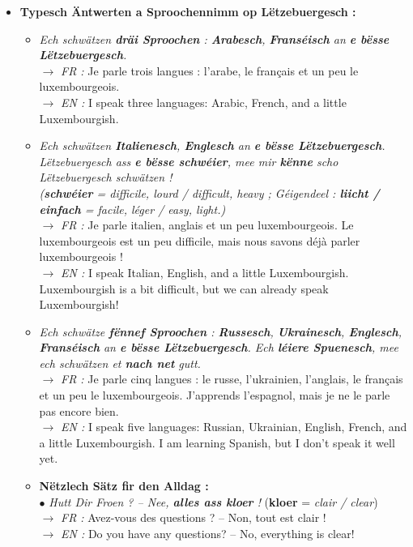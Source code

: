 \begin{itemize}
    \item \textbf{Typesch Äntwerten a Sproochennimm op Lëtzebuergesch :}
    \begin{itemize}
        \item \textit{Ech schwätzen \textbf{dräi Sproochen} : \textbf{Arabesch}, \textbf{Franséisch} an \textbf{e bësse Lëtzebuergesch}.} \\
        $\rightarrow$ \textit{FR :} Je parle trois langues : l'arabe, le français et un peu le luxembourgeois. \\
        $\rightarrow$ \textit{EN :} I speak three languages: Arabic, French, and a little Luxembourgish.
        \item \textit{Ech schwätzen \textbf{Italienesch}, \textbf{Englesch} an \textbf{e bësse Lëtzebuergesch}. Lëtzebuergesch ass \textbf{e bësse schwéier}, mee mir \textbf{kënne} scho Lëtzebuergesch schwätzen !} \\
        \textit{(\textbf{schwéier} = difficile, lourd / difficult, heavy ; Géigendeel : \textbf{liicht / einfach} = facile, léger / easy, light.)} \\
        $\rightarrow$ \textit{FR :} Je parle italien, anglais et un peu luxembourgeois. Le luxembourgeois est un peu difficile, mais nous savons déjà parler luxembourgeois ! \\
        $\rightarrow$ \textit{EN :} I speak Italian, English, and a little Luxembourgish. Luxembourgish is a bit difficult, but we can already speak Luxembourgish!
        \item \textit{Ech schwätze \textbf{fënnef Sproochen} : \textbf{Russesch}, \textbf{Ukrainesch}, \textbf{Englesch}, \textbf{Franséisch} an \textbf{e bësse Lëtzebuergesch}. Ech \textbf{léiere Spuenesch}, mee ech schwätzen et \textbf{nach net} gutt.} \\
        $\rightarrow$ \textit{FR :} Je parle cinq langues : le russe, l'ukrainien, l'anglais, le français et un peu le luxembourgeois. J'apprends l'espagnol, mais je ne le parle pas encore bien. \\
        $\rightarrow$ \textit{EN :} I speak five languages: Russian, Ukrainian, English, French, and a little Luxembourgish. I am learning Spanish, but I don't speak it well yet.
        \item \textbf{Nëtzlech Sätz fir den Alldag :} \\
        $\bullet$ \textit{Hutt Dir Froen ? -- Nee, \textbf{alles ass kloer} !} (\textbf{kloer} = \textit{clair / clear}) \\
        $\rightarrow$ \textit{FR :} Avez-vous des questions ? -- Non, tout est clair ! \\
        $\rightarrow$ \textit{EN :} Do you have any questions? -- No, everything is clear!
    \end{itemize}
\end{itemize}

